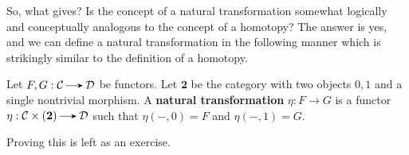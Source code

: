     So, what gives? Is the concept of a natural transformation somewhat logically 
    and conceptually analogous to the concept of a homotopy? The answer is yes, and we can define 
    a natural transformation in the following manner which is strikingly similar to the 
    definition of a homotopy. 
    \begin{definition}\label{definition:nat_trans_homotopy}
        Let $F, G: \cc \to \dd$ be functors. Let $\bm{2}$ be the 
        category with two objects $0, 1$ and a single nontrivial morphism.
        A \textbf{natural transformation} $\eta: F \to G$ is a functor 
        $\eta: \cc \times (\bm{2}) \to \dd$ such that  $\eta(-, 0) = F$
        and $\eta(-, 1)= G$. 
    \end{definition}

    Proving this is left as an exercise.

